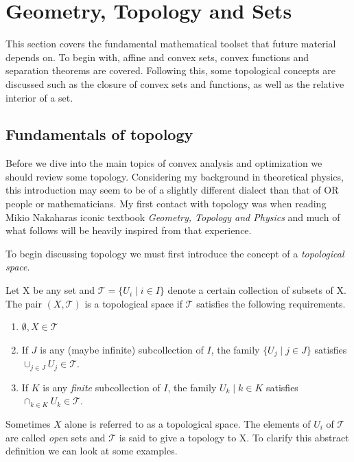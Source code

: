\section{Geometry, Topology and Sets}

This section covers the fundamental mathematical toolset that future material depends on.
To begin with, affine and convex sets, convex functions and separation theorems are covered.
Following this, some topological concepts are discussed such as the closure of convex sets and functions, as well as the relative interior of a set.

\subsection{Fundamentals of topology}

\newcommand{\T}{\mathcal{T}}

Before we dive into the main topics of convex analysis and optimization we should review some topology. 
Considering my background in theoretical physics, this introduction may seem to be of a slightly different dialect than that of OR people or mathematicians. 
My first contact with topology was when reading Mikio Nakaharas iconic textbook \textit{Geometry, Topology and Physics} \cite{Nakahara:2003nw} and much of what follows will be heavily inspired from that experience.

To begin discussing topology we must first introduce the concept of a \textit{topological space}. 
\begin{Def}
    Let X be any set and $\T = \{U_i \mid i \in I \}$ denote a certain collection of subsets of X.
    The pair $(X, \T)$ is a topological space if $\T$ satisfies the following requirements.
    \begin{enumerate}[label=(\roman*)]
        \item $\emptyset, X \in \T$
        \item If $J$ is any (maybe infinite) subcollection of $I$, the family $\{U_j \mid j \in J\}$ satisfies $\cup_{j \in J} U_j \in \T$.
        \item If $K$ is any \textit{finite} subcollection of $I$, the family ${U_k \mid k \in K}$ satisfies $\cap_{k \in K} U_k \in \T$.
    \end{enumerate} 
\end{Def}

Sometimes $X$ alone is referred to as a topological space.
The elements of $U_i$ of $\T$ are called \textit{open} sets and $\T$ is said to give a topology to X.
To clarify this abstract definition we can look at some examples.

